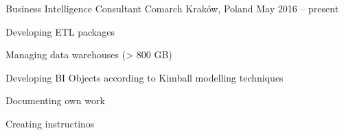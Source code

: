 

\begin{cventries}

  \cventry
    {Business Intelligence Consultant} %
    {Comarch} %
    {Kraków, Poland} %
    {May 2016 -- present} %
    {
      \begin{cvitems} %
        \item {Developing ETL packages}
        \item {Managing data warehouses (> 800 GB)}
        \item {Developing BI Objects according to Kimball modelling techniques}
        \item {Documenting own work}
        \item {Creating instructinos}
      \end{cvitems}
    }


\end{cventries}
